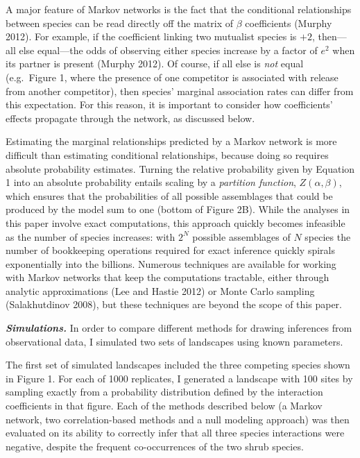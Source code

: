 \documentclass[12pt,]{article}
\begin{document}
\begin{spacing}{1.9}
\begin{flushleft}
A major feature of Markov networks is the fact that the conditional
relationships between species can be read directly off the matrix of
\(\beta\) coefficients (Murphy 2012). For example, if the coefficient
linking two mutualist species is \(+2\), then---all else equal---the
odds of observing either species increase by a factor of \(e^2\) when
its partner is present (Murphy 2012). Of course, if all else is
\emph{not} equal (e.g.~Figure 1, where the presence of one competitor is
associated with release from another competitor), then species' marginal
association rates can differ from this expectation. For this reason, it
is important to consider how coefficients' effects propagate through the
network, as discussed below.

Estimating the marginal relationships predicted by a Markov network is
more difficult than estimating conditional relationships, because doing
so requires absolute probability estimates. Turning the relative
probability given by Equation 1 into an absolute probability entails
scaling by a \emph{partition function}, \(Z(\alpha, \beta)\), which
ensures that the probabilities of all possible assemblages that could be
produced by the model sum to one (bottom of Figure 2B). While the
analyses in this paper involve exact computations, this approach quickly
becomes infeasible as the number of species increases: with \(2^N\)
possible assemblages of \(N\) species the number of bookkeeping
operations required for exact inference quickly spirals exponentially
into the billions. Numerous techniques are available for working with
Markov networks that keep the computations tractable, either through
analytic approximations (Lee and Hastie 2012) or Monte Carlo sampling
(Salakhutdinov 2008), but these techniques are beyond the scope of this
paper.

\textbf{\emph{Simulations.}} In order to compare different methods for
drawing inferences from observational data, I simulated two sets of
landscapes using known parameters.

The first set of simulated landscapes included the three competing
species shown in Figure 1. For each of 1000 replicates, I generated a
landscape with 100 sites by sampling exactly from a probability
distribution defined by the interaction coefficients in that figure.
Each of the methods described below (a Markov network, two
correlation-based methods and a null modeling approach) was then
evaluated on its ability to correctly infer that all three species
interactions were negative, despite the frequent co-occurrences of the
two shrub species.


\end{flushleft}
\end{spacing}
\end{document}
